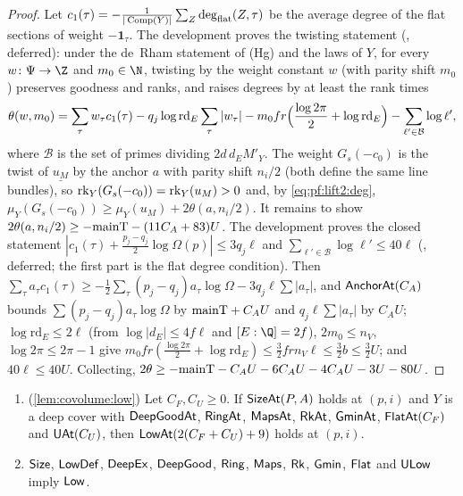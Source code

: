\begin{proof}
Let $c_1(\tau)=-\frac1{|\operatorname{Comp}(Y)|}\sum_Z\deg_{\mathrm{flat}}(Z,\tau)$ be the average degree of the flat sections
of weight $-\mathbf 1_\tau$. The development proves the twisting statement
(, deferred): under the de~Rham statement of \textup{(Hg)}
and the laws of $Y$, for every $w\colon\Psi\to\Z$ and $m_0\in\N$, twisting by the weight constant $w$ (with parity
shift $m_0$) preserves goodness and ranks, and raises degrees by at least the rank times
\[
\theta(w,m_0)=\sum_\tau w_\tau c_1(\tau)-q_j\log\mathrm{rd}_E\sum_\tau|w_\tau|-m_0fr\Bigl(\frac{\log2\pi}2+\log\mathrm{rd}_E\Bigr)
-\sum_{\ell'\in\mathcal B}\log\ell',
\]
where $\mathcal B$ is the set of primes dividing $2d\,d_EM'_Y$. The weight $G_s(-c_0)$ is the twist of $\underline{u_M}$
by the anchor $a$ with parity shift $n_i/2$ (both define the same line bundles), so
$\operatorname{rk}_Y(G_s(-c_0))=\operatorname{rk}_Y(u_M)>0$ and, by \eqref{eq:pf:lift2:deg}, $\mu_Y(G_s(-c_0))\ge\mu_Y(u_M)+2\theta(a,n_i/2)$.
It remains to show $2\theta(a,n_i/2)\ge-\mathrm{mainT}-(11C_A+83)U$. The development proves the closed statement
$|c_1(\tau)+\frac{p_j-q_j}2\log\Omega(p)|\le3q_j\ell$ and $\sum_{\ell'\in\mathcal B}\log\ell'\le40\ell$
(, deferred; the first part is the flat
degree condition). Then $\sum_\tau a_\tau c_1(\tau)\ge-\frac12\sum_\tau(p_j-q_j)a_\tau\log\Omega-3q_j\ell\sum|a_\tau|$, and
$\mathsf{AnchorAt}(C_A)$ bounds $\sum(p_j-q_j)a_\tau\log\Omega$ by $\mathrm{mainT}+C_AU$ and $q_j\ell\sum|a_\tau|$ by
$C_AU$; $\log\mathrm{rd}_E\le2\ell$ (from $\log|d_E|\le4f\ell$ and $[E:\Q]=2f$), $2m_0\le n_V$, $\log2\pi\le2\pi-1$ give
$m_0fr(\frac{\log2\pi}2+\log\mathrm{rd}_E)\le\frac{3}2frn_V\ell\le\frac32b\le\frac32U$; and $40\ell\le40U$. Collecting,
$2\theta\ge-\mathrm{mainT}-C_AU-6C_AU-4C_AU-3U-80U$.
\end{proof}

\begin{proposition}\label{pf:lift2:low}
\begin{enumerate}[label=(\alph*)]
\item (\cref{lem:covolume:low}) Let $C_F,C_U\ge0$. If $\mathsf{SizeAt}(P,A)$ holds at $(p,i)$ and $Y$ is a deep cover
with $\mathsf{DeepGoodAt}$, $\mathsf{RingAt}$, $\mathsf{MapsAt}$, $\mathsf{RkAt}$, $\mathsf{GminAt}$,
$\mathsf{FlatAt}(C_F)$ and $\mathsf{UAt}(C_U)$, then $\mathsf{LowAt}(2(C_F+C_U)+9)$ holds at $(p,i)$.
\item $\mathsf{Size}$, $\mathsf{LowDef}$, $\mathsf{DeepEx}$, $\mathsf{DeepGood}$, $\mathsf{Ring}$,
$\mathsf{Maps}$, $\mathsf{Rk}$, $\mathsf{Gmin}$, $\mathsf{Flat}$ and $\mathsf{ULow}$ imply $\mathsf{Low}$.
\end{enumerate}
\end{proposition}

